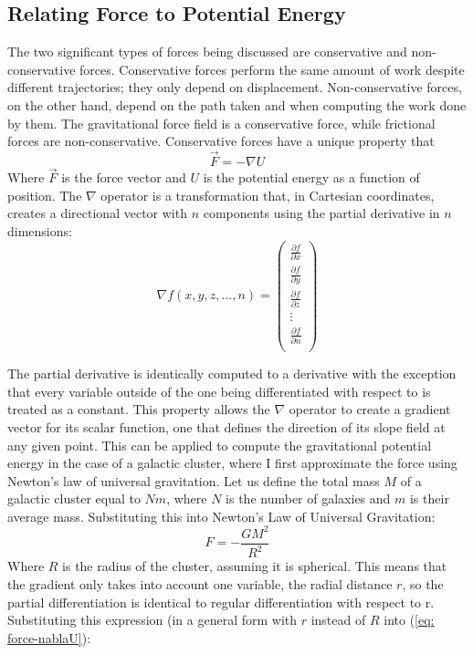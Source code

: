 \documentclass[12pt]{article}
\begin{document}
\subsection{Relating Force to Potential Energy}
The two significant types of forces being discussed are conservative and non-conservative forces. Conservative forces perform the same amount of work despite different trajectories; they only depend on displacement. Non-conservative forces, on the other hand, depend on the path taken and when computing the work done by them. The gravitational force field is a conservative force, while frictional forces are non-conservative. Conservative forces have a unique property that
\begin{equation}\label{eq: force-nablaU}
    \vec{F} = -\nabla U
\end{equation}
Where $\vec{F}$ is the force vector and $U$ is the potential energy as a function of position. The $\nabla$ operator is a transformation that, in Cartesian coordinates, creates a directional vector with $n$ components using the partial derivative in $n$ dimensions:
\begin{equation} \label{eq:nabladefinition}
\nabla f(x,y,z, ..., n) = \begin{pmatrix}
    \frac{\partial f}{\partial x} \\
    \frac{\partial f}{\partial y} \\
    \frac{\partial f}{\partial z} \\
    \vdots\\
    \frac{\partial f}{\partial n} \\
\end{pmatrix}
\end{equation}

The partial derivative is identically computed to a derivative with the exception that every variable outside of the one being differentiated with respect to is treated as a constant. This property allows the $\nabla$ operator to create a gradient vector for its scalar function, one that defines the direction of its slope field at any given point. This can be applied to compute the gravitational potential energy in the case of a galactic cluster, where I first approximate the force using Newton's law of universal gravitation. Let us define the total mass $M$ of a galactic cluster equal to $Nm$, where $N$ is the number of galaxies and $m$ is their average mass. Substituting this into Newton's Law of Universal Gravitation:
\begin{equation}
    F = -\frac{GM^2}{R^2}
\end{equation}
Where $R$ is the radius of the cluster, assuming it is spherical. This means that the gradient only takes into account one variable, the radial distance $r$, so the partial differentiation is identical to regular differentiation with respect to r. Substituting this expression (in a general form with $r$ instead of $R$ into (\ref{eq: force-nablaU}):
\end{document}
